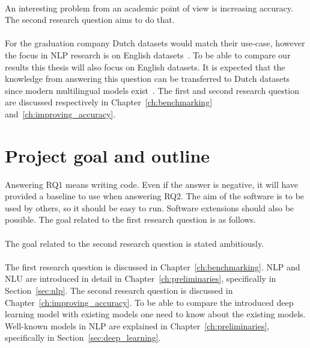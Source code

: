 \rqone \\[1mm]

An interesting problem from an academic point of view is increasing accuracy.
The second research question aims to do that.\\

\rqtwo \\[1mm]

For the graduation company Dutch datasets would match their use-case, however the focus in NLP research is on English datasets~\citep{cambria2014jumping,young2018recent}.
To be able to compare our results this thesis will also focus on English datasets.
It is expected that the knowledge from answering this question can be transferred to Dutch datasets since modern multilingual models exist~\citep{spacy2019models,subramanian2018learning,devlin2018}.
The first and second research question are discussed respectively in Chapter~\ref{ch:benchmarking} and~\ref{ch:improving_accuracy}.

\section{Project goal and outline}
\label{sec:project_goal}
Answering RQ1 means writing code.
Even if the answer is negative, it will have provided a baseline to use when answering RQ2.
The aim of the software is to be used by others, so it should be easy to run.
Software extensions should also be possible.
The goal related to the first research question is as follows.\\

\rgone \\

\noindent The goal related to the second research question is stated ambitiously.\\

\rgtwo \\

The first research question is discussed in Chapter~\ref{ch:benchmarking}.
NLP and NLU are introduced in detail in Chapter~\ref{ch:preliminaries}, specifically in Section~\ref{sec:nlp}.
The second research question is discussed in Chapter~\ref{ch:improving_accuracy}.
To be able to compare the introduced deep learning model with existing models one need to know about the existing models.
Well-known models in NLP are explained in Chapter~\ref{ch:preliminaries}, specifically in Section~\ref{sec:deep_learning}.